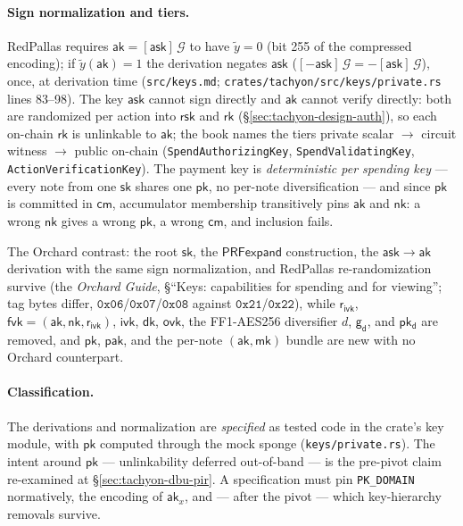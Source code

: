 \documentclass[11pt,a4paper]{article}
\theoremstyle{definition}
\newcommand{\cmsym}{\mathsf{cm}}
\newcommand{\rk}{\mathsf{rk}}
\newcommand{\ask}{\ensuremath{\mathsf{ask}}}
\newcommand{\aksym}{\ensuremath{\mathsf{ak}}}
\newcommand{\nksym}{\ensuremath{\mathsf{nk}}}
\newcommand{\ivk}{\ensuremath{\mathsf{ivk}}}
\newcommand{\fvk}{\ensuremath{\mathsf{fvk}}}
\newcommand{\ovk}{\ensuremath{\mathsf{ovk}}}
\newcommand{\dk}{\ensuremath{\mathsf{dk}}}
\newcommand{\pkd}{\ensuremath{\mathsf{pk_d}}}
\newcommand{\gd}{\ensuremath{\mathsf{g_d}}}
\newcommand{\rivk}{\ensuremath{\mathsf{r_{ivk}}}}
\newcommand{\rsk}{\ensuremath{\mathsf{rsk}}}
\begin{document}
\paragraph{Sign normalization and tiers.} RedPallas requires
$\aksym = [\ask]\,\mathcal{G}$ to have $\tilde{y} = 0$ (bit 255 of the
compressed encoding); if $\tilde{y}(\aksym) = 1$ the derivation negates
$\ask$ ($[-\ask]\,\mathcal{G} = -[\ask]\,\mathcal{G}$), once, at derivation
time (\texttt{src/keys.md}; \texttt{crates/tachyon/src/keys/private.rs}
lines 83--98). The key $\ask$ cannot sign directly and $\aksym$ cannot
verify directly: both are randomized per action into $\rsk$ and $\rk$
(\S\ref{sec:tachyon-design-auth}), so each on-chain $\rk$ is unlinkable to
$\aksym$; the book names the tiers private scalar $\to$ circuit witness
$\to$ public on-chain (\texttt{SpendAuthorizingKey},
\texttt{SpendValidatingKey}, \texttt{ActionVerificationKey}). The payment
key is \emph{deterministic per spending key} --- every note from one
$\mathsf{sk}$ shares one $\mathsf{pk}$, no per-note diversification --- and
since $\mathsf{pk}$ is committed in $\cmsym$, accumulator membership
transitively pins $\aksym$ and $\nksym$: a wrong $\nksym$ gives a wrong
$\mathsf{pk}$, a wrong $\cmsym$, and inclusion fails.

The Orchard contrast: the root $\mathsf{sk}$, the $\mathsf{PRFexpand}$
construction, the $\ask \to \aksym$ derivation with the same sign
normalization, and RedPallas re-randomization survive (the \emph{Orchard
Guide}, \S``Keys: capabilities for spending and for viewing''; tag bytes
differ, $\mathtt{0x06}$/$\mathtt{0x07}$/$\mathtt{0x08}$ against
$\mathtt{0x21}$/$\mathtt{0x22}$), while $\rivk$, $\fvk = (\aksym, \nksym,
\rivk)$, $\ivk$, $\dk$, $\ovk$, the FF1-AES256 diversifier $d$, $\gd$, and
$\pkd$ are removed, and $\mathsf{pk}$, $\mathsf{pak}$, and the per-note
$(\aksym, \mathsf{mk})$ bundle are new with no Orchard counterpart.

\paragraph{Classification.} The derivations and normalization are
\emph{specified} as tested code in the crate's key module, with
$\mathsf{pk}$ computed through the mock sponge
(\texttt{keys/private.rs}). The intent around $\mathsf{pk}$ ---
unlinkability deferred out-of-band --- is the pre-pivot claim re-examined
at \S\ref{sec:tachyon-dbu-pir}. A specification must pin
\texttt{PK\_DOMAIN} normatively, the encoding of $\aksym_x$, and --- after
the pivot --- which key-hierarchy removals survive.
\end{document}
